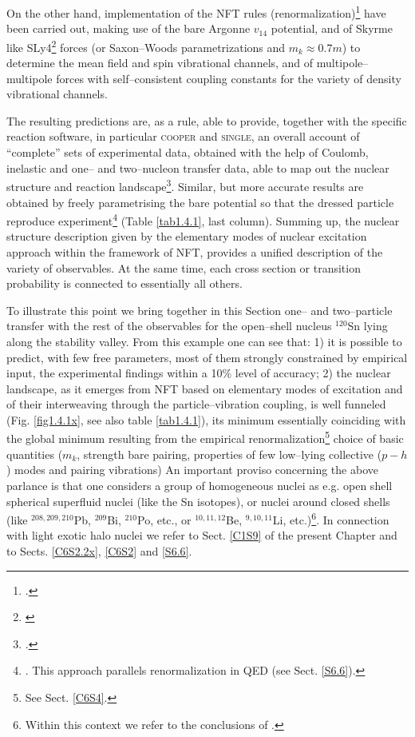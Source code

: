 On the other hand,  implementation of the NFT rules (renormalization)\footnote{\cite{Broglia:16}.} have been carried out, making use of the bare Argonne $v_{14}$ potential, and of Skyrme like SLy4\footnote{\cite{Chabanat:97}} forces (or Saxon--Woods parametrizations and $m_k\approx0.7 m$) to determine the mean field and spin vibrational channels, and of multipole--multipole forces with self--consistent  coupling constants for the variety of density vibrational channels.


The resulting predictions are, as a rule, able to provide, together with the specific reaction software, in particular \textsc{cooper} and \textsc{single}, an overall account of ``complete'' sets of experimental data, obtained with the help of Coulomb, inelastic and one-- and two--nucleon transfer data, able to map out the nuclear structure and reaction landscape\footnote{\cite{Idini:15,Idini:14,Potel:13}.}. Similar, but more accurate results are obtained by freely parametrising the bare potential so that the dressed particle reproduce experiment\footnote{\cite{Barranco:17}. This approach parallels renormalization in QED (see Sect. \ref{S6.6}).} (Table \ref{tab1.4.1}, last column).  Summing up, the nuclear structure description given by the elementary modes of nuclear excitation approach within the framework of NFT, provides a unified description of the variety of observables. At the same time, each cross section or transition probability is connected to essentially all others.


To illustrate this point we  bring together  in this Section  one-- and two--particle transfer with the rest of the observables  for the open--shell nucleus $^{120}$Sn lying  along the stability valley. From this example one can see that: 1) it is possible to predict, with few free parameters, most of them strongly constrained by empirical input, the experimental findings within a 10\% level of accuracy; 2) the nuclear landscape, as it emerges from NFT based on elementary modes of excitation and of their interweaving through the particle--vibration coupling, is well funneled (Fig. \ref{fig1.4.1x}, see also table \ref{tab1.4.1}), its minimum essentially coinciding with the global minimum resulting from the empirical renormalization\footnote{See Sect. \ref{C6S4}.} choice of basic quantities ($m_k$, strength bare pairing, properties of few low--lying collective ($p-h$) modes  and pairing vibrations) An important proviso concerning the above parlance is that one considers a group of homogeneous nuclei as e.g. open shell spherical superfluid nuclei (like the Sn isotopes), or nuclei around closed shells (like $^{208,209,210}$Pb, $^{209}$Bi, $^{210}$Po, etc., or $^{10,11,12}$Be, $^{9,10,11}$Li, etc.)\footnote{Within this context we refer to the conclusions of \cite{Idini:15}.}. In connection with light exotic halo nuclei we refer to Sect. \ref{C1S9} of the present Chapter and to Sects. \ref{C6S2.2x},  \ref{C6S2} and \ref{S6.6}.




